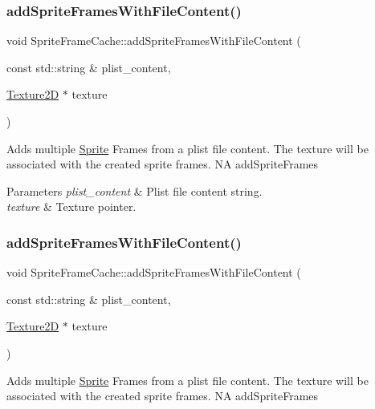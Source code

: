 \subsubsection{\texorpdfstring{add\+Sprite\+Frames\+With\+File\+Content()}{addSpriteFramesWithFileContent()}\hspace{0.1cm}{\footnotesize\ttfamily [1/2]}}
{\footnotesize\ttfamily void Sprite\+Frame\+Cache\+::add\+Sprite\+Frames\+With\+File\+Content (\begin{DoxyParamCaption}\item[{const std\+::string \&}]{plist\+\_\+content,  }\item[{\hyperlink{classTexture2D}{Texture2D} $\ast$}]{texture }\end{DoxyParamCaption})}

Adds multiple \hyperlink{classSprite}{Sprite} Frames from a plist file content. The texture will be associated with the created sprite frames.  NA  add\+Sprite\+Frames


\begin{DoxyParams}{Parameters}
{\em plist\+\_\+content} & Plist file content string. \\
\hline
{\em texture} & Texture pointer. \\
\hline
\end{DoxyParams}
\mbox{\label{classSpriteFrameCache_a6288e49af5e6b3b052de916565923c32}} 
\subsubsection{\texorpdfstring{add\+Sprite\+Frames\+With\+File\+Content()}{addSpriteFramesWithFileContent()}\hspace{0.1cm}{\footnotesize\ttfamily [2/2]}}
{\footnotesize\ttfamily void Sprite\+Frame\+Cache\+::add\+Sprite\+Frames\+With\+File\+Content (\begin{DoxyParamCaption}\item[{const std\+::string \&}]{plist\+\_\+content,  }\item[{\hyperlink{classTexture2D}{Texture2D} $\ast$}]{texture }\end{DoxyParamCaption})}

Adds multiple \hyperlink{classSprite}{Sprite} Frames from a plist file content. The texture will be associated with the created sprite frames.  NA  add\+Sprite\+Frames


